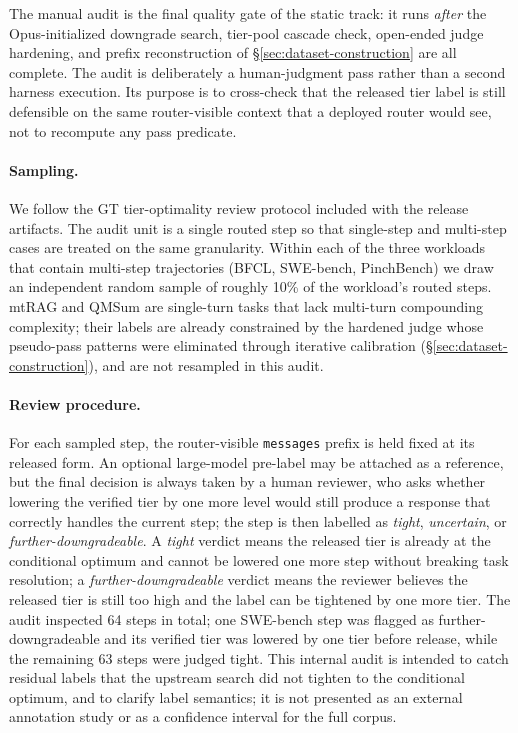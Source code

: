 The manual audit is the final quality gate of the static track: it runs
\emph{after} the Opus-initialized downgrade search, tier-pool cascade check,
open-ended judge hardening, and prefix reconstruction of
\S\ref{sec:dataset-construction} are all complete. The audit is deliberately a
human-judgment pass rather than a second harness execution. Its purpose is to
cross-check that the released tier label is still defensible on the same
router-visible context that a deployed router would see, not to recompute any
pass predicate.

\paragraph{Sampling.}
We follow the GT tier-optimality review protocol included with the release
artifacts. The audit unit is a single routed step so that single-step and
multi-step cases are treated on the same granularity. Within each of the
three workloads that contain multi-step trajectories (BFCL, SWE-bench,
PinchBench) we draw an independent random sample of roughly 10\% of the
workload's routed steps. mtRAG and QMSum are single-turn tasks that lack
multi-turn compounding complexity; their labels are already constrained by the
hardened judge whose pseudo-pass patterns were eliminated through iterative
calibration (\S\ref{sec:dataset-construction}), and are not resampled in this
audit.

\paragraph{Review procedure.}
For each sampled step, the router-visible \texttt{messages} prefix is held
fixed at its released form. An optional large-model pre-label may be attached
as a reference, but the final decision is always taken by a human reviewer,
who asks whether lowering the verified tier by one more level would still
produce a response that correctly handles the current step; the step is then
labelled as \emph{tight}, \emph{uncertain}, or \emph{further-downgradeable}. A \emph{tight} verdict means the released tier
is already at the conditional optimum and cannot be lowered one more step
without breaking task resolution; a \emph{further-downgradeable} verdict means
the reviewer believes the released tier is still too high and the label can
be tightened by one more tier. The audit inspected 64 steps in total; one
SWE-bench step was flagged as further-downgradeable and its verified tier was
lowered by one tier before release, while the remaining 63 steps were judged
tight. This internal audit is intended to catch residual labels that the
upstream search did not tighten to the conditional optimum, and to clarify
label semantics; it is not presented as an external annotation study or as a
confidence interval for the full corpus.

